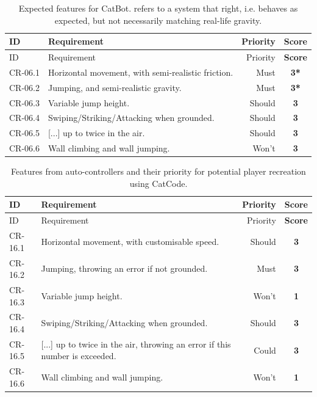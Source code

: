 \begin{center}
  \begin{longtable}{llrc}
    \caption[Desired CatBot Features]{Expected features for CatBot.  refers to a system that  right, i.e. behaves as expected, but not necessarily matching real-life gravity.} \label{tab:results/cr/autoCatFeatures} \\
    \toprule
    ID
    & Requirement
    & Priority
    & \textbf{Score} \\ \midrule
    \endfirsthead
    \toprule
    ID
    & Requirement
    & Priority
    & \textbf{Score}\\ \midrule
    \endhead
    CR-06.1
    & Horizontal movement, with semi-realistic friction.
    & Must
    & \textbf{3*}
    \\
    CR-06.2
    & Jumping, and semi-realistic gravity.
    & Must
    & \textbf{3*}
    \\
    CR-06.3
    & Variable jump height.
    & Should
    & \textbf{3}
    \\
    CR-06.4
    & Swiping/Striking/Attacking when grounded.
    & Should
    & \textbf{3}
    \\
    CR-06.5
    & [...] up to twice in the air.
    & Should
    & \textbf{3}
    \\
    CR-06.6
    & Wall climbing and wall jumping.
    & Won't
    & \textbf{3}
    \\ 
    \bottomrule
  \end{longtable}
\end{center}

\begin{center}
  \begin{longtable}{lp{9.5cm}rc}
    \caption[Features required to have CatCode equivalent]{Features from auto-controllers and their priority for potential player recreation using CatCode.} \label{tab:results/cr/autoCatFeaturesInCatCode} \\
    \toprule
    ID
    & Requirement
    & Priority
    & \textbf{Score}\\ \midrule
    \endfirsthead
    \toprule
    ID
    & Requirement
    & Priority
    & \textbf{Score}\\ \midrule
    \endhead
    CR-16.1
    & Horizontal movement, with customisable speed.
    & Should
    & \textbf{3}
    \\
    CR-16.2
    & Jumping, throwing an error if not grounded.
    & Must
    & \textbf{3}
    \\
    CR-16.3
    & Variable jump height.
    & Won't
    & \textbf{1}
    \\
    CR-16.4
    & Swiping/Striking/Attacking when grounded.
    & Should
    & \textbf{3}
    \\
    CR-16.5
    & [...] up to twice in the air, throwing an error if this number is exceeded.
    & Could
    & \textbf{3}
    \\
    CR-16.6
    & Wall climbing and wall jumping.
    & Won't
    & \textbf{1}
    \\ 
    \bottomrule
  \end{longtable}
\end{center}

